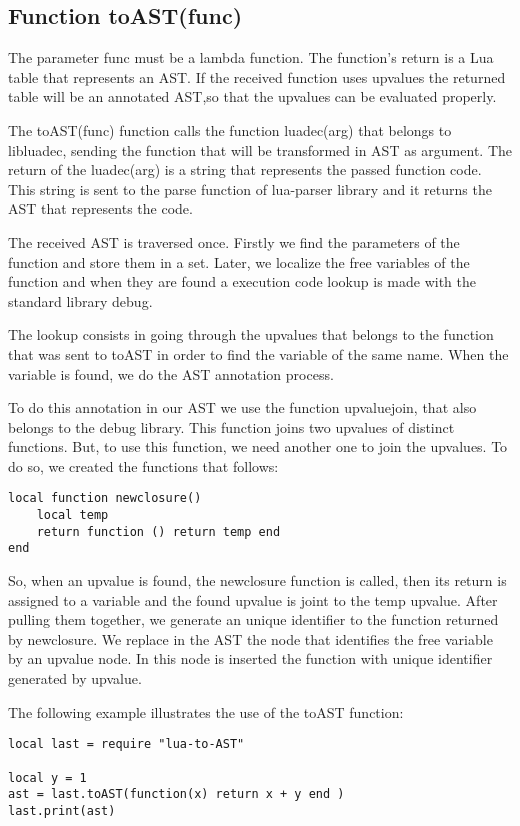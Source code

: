 \documentclass[english]{llncs}
\begin{document}
\subsection{Function toAST(func) }

The parameter func must be a lambda function.
The function's return is a Lua table that represents an AST.
If the received function uses upvalues the returned table will be an annotated AST,so that the upvalues can be evaluated properly.

The toAST(func) function calls the function luadec(arg) that belongs to libluadec, sending the function that will be transformed in AST as argument.
The return of the luadec(arg) is a string that represents the passed function code.
This string is sent to the parse function of lua-parser library and it returns the AST that represents the code.

The received AST is traversed once.
Firstly we find the parameters of the function and store them in a set.
Later, we localize the free variables of the  function and when they are found a execution code lookup is made with the standard library debug.

The lookup consists in going through the upvalues that belongs to the function that was sent to toAST in order to find the variable of the same name.
When the variable is found, we do the AST annotation process.

To do this annotation in our AST we use the function upvaluejoin, that also belongs to the debug library.
This function joins two upvalues of distinct functions.
But, to use this function, we need another one to join the upvalues. To do so, we created the functions that follows:


\pagebreak
\begin{verbatim}
local function newclosure()
    local temp
    return function () return temp end
end
\end{verbatim}

So, when an upvalue is found, the newclosure function is called, then its return is assigned to a variable and the found upvalue is joint to the temp upvalue.
After pulling them together, we generate an unique identifier to the function returned by newclosure.
We replace in the AST the node that identifies the free variable by an upvalue node.
In this node is inserted the function with unique identifier generated by upvalue.


The following example illustrates the use of the toAST function:


\begin{verbatim}
local last = require "lua-to-AST"

local y = 1
ast = last.toAST(function(x) return x + y end )
last.print(ast)
\end{verbatim}
\end{document}
